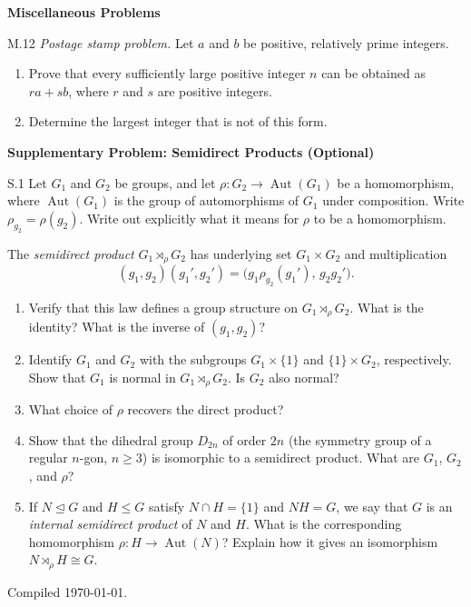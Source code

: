 \documentclass[11pt]{article}
\newcommand{\sectionheading}[1]{%
  \Needspace{8\baselineskip}
  \vspace{0.25em}
  {\color{darkgray}\large\bfseries #1}\par
}
\begin{document}
\newpage
\sectionheading{Miscellaneous Problems}

\begin{exercise}{M.12}
\textit{Postage stamp problem.} Let $a$ and $b$ be positive, relatively
prime integers.
\begin{enumerate}[label=\textbf{(\alph*)}]
  \item Prove that every sufficiently large positive integer $n$ can be
        obtained as $ra+sb$, where $r$ and $s$ are positive integers.
  \item Determine the largest integer that is not of this form.
\end{enumerate}
\end{exercise}

\sectionheading{Supplementary Problem: Semidirect Products (Optional)}

\begin{exercise}{S.1}
Let $G_1$ and $G_2$ be groups, and let
$\rho\colon G_2\to\operatorname{Aut}(G_1)$ be a homomorphism, where
$\operatorname{Aut}(G_1)$ is the group of automorphisms of $G_1$ under
composition. Write $\rho_{g_2}=\rho(g_2)$. Write out explicitly what it
means for $\rho$ to be a homomorphism.

The \emph{semidirect product} $G_1\rtimes_\rho G_2$ has underlying set
$G_1\times G_2$ and multiplication
\[
  (g_1,g_2)(g_1',g_2')
  =\bigl(g_1\rho_{g_2}(g_1'),\,g_2g_2'\bigr).
\]
\begin{enumerate}[label=\textbf{(\alph*)}]
  \item Verify that this law defines a group structure on
        $G_1\rtimes_\rho G_2$. What is the identity? What is the inverse
        of $(g_1,g_2)$?
  \item Identify $G_1$ and $G_2$ with the subgroups
        $G_1\times\{1\}$ and $\{1\}\times G_2$, respectively.
        Show that $G_1$ is normal in $G_1\rtimes_\rho G_2$.
        Is $G_2$ also normal?
  \item What choice of $\rho$ recovers the direct product?
  \item Show that the dihedral group $D_{2n}$ of order $2n$
        (the symmetry group of a regular $n$-gon, $n\geq3$) is
        isomorphic to a semidirect product. What are $G_1$, $G_2$,
        and $\rho$?
  \item If $N\trianglelefteq G$ and $H\leq G$ satisfy
        $N\cap H=\{1\}$ and $NH=G$, we say that $G$ is an
        \emph{internal semidirect product} of $N$ and $H$.
        What is the corresponding homomorphism
        $\rho\colon H\to\operatorname{Aut}(N)$? Explain how it gives
        an isomorphism $N\rtimes_\rho H\cong G$.
\end{enumerate}
\end{exercise}

\vfill
{\small\color{darkgray}Compiled \today.}
\end{document}
